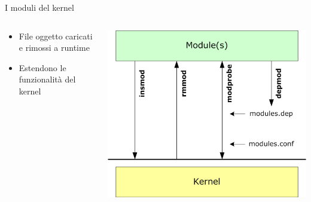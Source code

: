 \documentclass[12pt]{beamer}
\begin{document}
  \begin{frame}[fragile]{I moduli del kernel}
    \begin{columns}
    	\begin{column}{0.4\textwidth}
    		\begin{itemize}
    			\item<1> File oggetto caricati e rimossi a runtime
    			\item<2> Estendono le funzionalità del kernel
    		\end{itemize}
    	\end{column}
    	\begin{column}{0.6\textwidth}
    		\includegraphics[scale=0.3]{res/Module}
    	\end{column}
    \end{columns}
  \end{frame}
\end{document}
